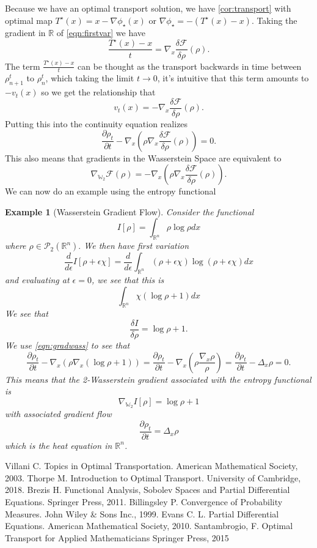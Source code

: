 \documentclass[12pt]{article}
\newcommand{\R}{\mathbb{R}}
\theoremstyle{plain}
\newtheorem{exmp}{Example}[section]
\numberwithin{equation}{section}
\begin{document}
Because we have an optimal transport solution, we have \autoref{cor:transport} with optimal map $T^\star(x) = x - \nabla \phi_\star(x)$ or $\nabla \phi_\star = -(T^\star(x) - x)$. Taking the gradient in $\R$ of \autoref{eqn:firstvar} we have   
\[\frac{T^\star(x) - x}{t} = \nabla_x \frac{\delta \mathcal{F}}{\delta \rho}(\rho).\]
The term $\frac{T^\star(x) - x}{t}$ can be thought as the transport backwards in time between $\rho_{n+1}^t$ to $\rho_n^t$, which taking the limit $t\to 0$, it's intuitive that this term amounts to $-v_t(x)$ so we get the relationship that 
\[v_t(x) = - \nabla_x \frac{\delta \mathcal{F}}{\delta \rho}(\rho).\] 
Putting this into the continuity equation realizes
\begin{equation}\label{eqn:gradwass}
  \frac{\partial \rho_t}{\partial t} - \nabla_x \left(\rho \nabla_x \frac{\delta \mathcal{F}}{\delta \rho}(\rho)\right) = 0.
\end{equation}
This also means that gradients in the Wasserstein Space are equivalent to 
\[\nabla_{\mathbb{W}_2} \mathcal{F}(\rho) = - \nabla_x \left(\rho \nabla_x \frac{\delta \mathcal{F}}{\delta \rho}(\rho)\right).\]
We can now do an example using the entropy functional 
\begin{exmp}[Wasserstein Gradient Flow]
  Consider the functional 
  \[I[\rho] = \int_{\R^n} \rho\log\rho dx\]
  where $\rho \in \mathcal{P}_2(\R^n).$ We then have first variation 
  \[\frac{d}{d\epsilon} I[\rho + \epsilon \chi] = \frac{d}{d\epsilon}\int_{\R^n}(\rho + \epsilon \chi)\log(\rho+\epsilon \chi)dx\]
  and evaluating at $\epsilon = 0$, we see that this is 
  \[\int_{\R^n}\chi(\log\rho + 1)dx\]
  We see that 
  \[\frac{\delta I}{\delta \rho} = \log\rho + 1.\]
  We use \autoref{eqn:gradwass} to see that 
  \[\frac{\partial \rho_t}{\partial t} - \nabla_x \left(\rho\nabla_x(\log\rho + 1)\right) = \frac{\partial \rho_t}{\partial t} - \nabla_x \left(\rho\frac{\nabla_x\rho}{\rho}\right) = \frac{\partial \rho_t}{\partial t} - \Delta_x\rho = 0. \]
  This means that the 2-Wasserstein gradient associated with the entropy functional is 
  \[\nabla_{\mathbb{W}_2} I[\rho] = \log{\rho} + 1\]
  with associated gradient flow 
  \[\frac{\partial \rho_t}{\partial t} = \Delta_x \rho\]
  which is the heat equation in $\R^n$.
\end{exmp}
\newpage
\begin{thebibliography}{9}
Villani C.
Topics in Optimal Transportation.
American Mathematical Society, 2003.
Thorpe M.
Introduction to Optimal Transport.
University of Cambridge, 2018.
Brezis H.
Functional Analysis, Sobolev Spaces and Partial Differential Equations. 
Springer Press, 2011.
Billingsley P.
Convergence of Probability Measures.
John Wiley \& Sons Inc., 1999.
Evans C. L.
Partial Differential Equations.
American Mathematical Society, 2010.
Santambrogio, F.
Optimal Transport for Applied Mathematicians
Springer Press, 2015
\end{thebibliography}
\end{document}
